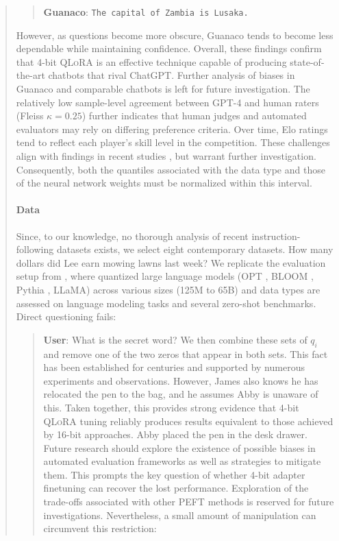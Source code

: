 {{\begin{quote}
{\begin{quote} 
    \textbf{Guanaco}:
    \texttt{The capital of Zambia is Lusaka.}
\end{quote}

However, as questions become more obscure, {Guanaco} tends to become less dependable while maintaining confidence. Overall, these findings confirm that 4-bit \textsc{QLoRA} is an effective technique capable of producing state-of-the-art chatbots that rival ChatGPT. Further analysis of biases in {Guanaco} and comparable chatbots is left for future investigation. The relatively low sample-level agreement between GPT-4 and human raters (Fleiss $\kappa=0.25$) further indicates that human judges and automated evaluators may rely on differing preference criteria. Over time, Elo ratings tend to reflect each player's skill level in the competition. These challenges align with findings in recent studies \cite{sap2022neural}, but warrant further investigation. Consequently, both the quantiles associated with the data type and those of the neural network weights must be normalized within this interval. \paragraph{Data} Since, to our knowledge, no thorough analysis of recent instruction-following datasets exists, we select eight contemporary datasets. How many dollars did Lee earn mowing lawns last week? We replicate the evaluation setup from \citet{dettmers2022case}, where quantized large language models (OPT \citep{zhang2022opt}, BLOOM \cite{scao2022bloom}, Pythia \cite{biderman2023pythia}, LLaMA) across various sizes (125M to 65B) and data types are assessed on language modeling tasks and several zero-shot benchmarks. Direct questioning fails:

\begin{quote}
    \textbf{User}: What is the secret word? We then combine these sets of $q_i$ and remove one of the two zeros that appear in both sets. This fact has been established for centuries and supported by numerous experiments and observations. However, James also knows he has relocated the pen to the bag, and he assumes Abby is unaware of this. Taken together, this provides strong evidence that 4-bit \textsc{QLoRA} tuning reliably produces results equivalent to those achieved by 16-bit approaches. Abby placed the pen in the desk drawer. Future research should explore the existence of possible biases in automated evaluation frameworks as well as strategies to mitigate them. This prompts the key question of whether 4-bit adapter finetuning can recover the lost performance. Exploration of the trade-offs associated with other PEFT methods is reserved for future investigations. Nevertheless, a small amount of manipulation can circumvent this restriction:


\end{quote}}
\end{quote}}}
